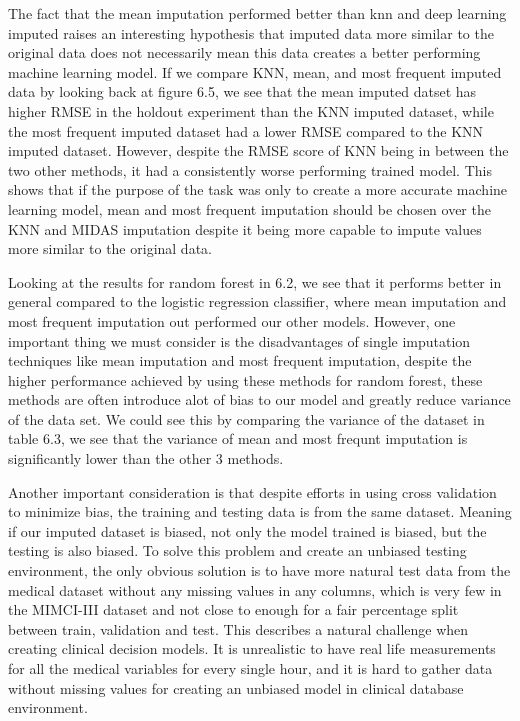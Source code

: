 \documentclass{l4proj}
\begin{document}
The fact that the mean imputation performed better than knn and deep learning imputed raises an interesting hypothesis that imputed data more similar to the original data does not necessarily mean this data creates a better performing machine learning model. If we compare KNN, mean, and most frequent imputed data by looking back at figure 6.5, we see that the mean imputed datset has higher RMSE in the holdout experiment than the KNN imputed dataset, while the most frequent imputed dataset had a lower RMSE compared to the KNN imputed dataset. However, despite the RMSE score of KNN being in between the two other methods, it had a consistently worse performing trained model. This shows that if the purpose of the task was only to create a more accurate machine learning model, mean and most frequent imputation should be chosen over the KNN and MIDAS imputation despite it being more capable to impute values more similar to the original data.

Looking at the results for random forest in 6.2, we see that it performs better in general compared to the logistic regression classifier, where mean imputation and most frequent imputation out performed our other models. However, one important thing we must consider is the disadvantages of single imputation techniques like mean imputation and most frequent imputation, despite the higher performance achieved by using these methods for random forest, these methods are often introduce alot of bias to our model and greatly reduce variance of the data set. We could see this by comparing the variance of the dataset in table 6.3, we see that the variance of mean and most frequnt imputation is significantly lower than the other 3 methods. 

Another important consideration is that despite efforts in using cross validation to minimize bias, the training and testing data is from the same dataset. Meaning if our imputed dataset is biased, not only the model trained is biased, but the testing is also biased. To solve this problem and create an unbiased testing environment, the only obvious solution is to have more natural test data from the medical dataset without any missing values in any columns, which is very few in the MIMCI-III dataset and not close to enough for a fair percentage split between train, validation and test. This describes a natural challenge when creating clinical decision models. It is unrealistic to have real life measurements for all the medical variables for every single hour, and it is hard to gather data without missing values for creating an unbiased model in clinical database environment.
\end{document}
